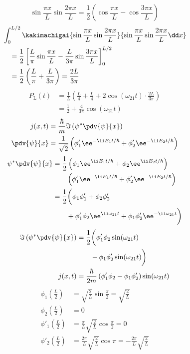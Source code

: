 \[ \sin\frac{\pi x}{L}\sin\frac{2\pi x}{L}=\frac{1}{2}\left(\cos\frac{\pi x}{L}-\cos\frac{3\pi x}{L}\right) \]
\begin{align*}
&\int_{0}^{L/2}\kakimachigai{\sin\frac{\pi x}{L}\sin\frac{2\pi x}{L}}{\sin\frac{\pi x}{L}\sin\frac{2\pi x}{L}\dd x}\\
&\quad=\frac{1}{2}\left[\frac{L}{\pi}\sin\frac{\pi x}{L}-\frac{L}{3\pi}\sin\frac{3\pi x}{L}\right]_{0}^{L/2}\\
&\quad=\frac{1}{2}\left(\frac{L}{\pi}+\frac{L}{3\pi}\right)=\frac{2L}{3\pi}
\end{align*}
\begin{align*}
P_{\mathrm{L}}(t)&=\frac{1}{L}\left(\frac{L}{4}+\frac{L}{4}+2\cos(\omega_{21}t)\cdot\frac{2L}{3\pi}\right)\\
&=\frac{1}{2}+\frac{4}{3\pi}\cos(\omega_{21}t)
\end{align*}
\begin{align*}
j(x,t)&=\frac{\hbar}{m}\Im\left(\psi^{*}\pdv{\psi}{x}\right)\\
\pdv{\psi}{x}&=\frac{1}{\sqrt{2}}\left(\phi'_{1}\ee^{-\ii E_{1}t/\hbar}+\phi'_{2}\ee^{-\ii E_{2}t/\hbar}\right)
\end{align*}
\begin{align*}
\psi^{*}\pdv{\psi}{x}&=\frac{1}{2}\left(\phi_{1}\ee^{\ii E_{1}t/\hbar}+\phi_{2}\ee^{\ii E_{2}t/\hbar}\right)\\
&\qquad\left(\phi'_{1}\ee^{-\ii E_{1}t/\hbar}+\phi'_{2}\ee^{-\ii E_{2}t/\hbar}\right)\\
&=\frac{1}{2}\biggl(\phi_{1}\phi'_{1}+\phi_{2}\phi'_{2}\\
&\qquad+\phi'_{1}\phi_{2}\ee^{\ii\omega_{21}t}+\phi_{1}\phi'_{2}\ee^{-\ii\omega_{21}t}\biggr)
\end{align*}
\begin{align*}
\Im\left(\psi^{*}\pdv{\psi}{x}\right)&=\frac{1}{2}\biggl(\phi'_{1}\phi_{2}\sin(\omega_{21}t)\\
&\qquad-\phi_{1}\phi'_{2}\sin(\omega_{21}t)\biggr)\\
j(x,t)&=\frac{\hbar}{2m}\left(\phi'_{1}\phi_{2}-\phi_{1}\phi'_{2}\right)\sin(\omega_{21}t)
\end{align*}
\begin{align*}
\phi_{1}\left(\frac{L}{2}\right)&=\sqrt{\frac{2}{L}}\sin\frac{\pi}{2}=\sqrt{\frac{2}{L}}\\
\phi_{2}\left(\frac{L}{2}\right)&=0\\
\phi'_{1}\left(\frac{L}{2}\right)&=\frac{\pi}{L}\sqrt{\frac{2}{L}}\cos\frac{\pi}{2}=0\\
\phi'_{2}\left(\frac{L}{2}\right)&=\frac{2\pi}{L}\sqrt{\frac{2}{L}}\cos\pi=-\frac{2\pi}{L}\sqrt{\frac{2}{L}}
\end{align*}
